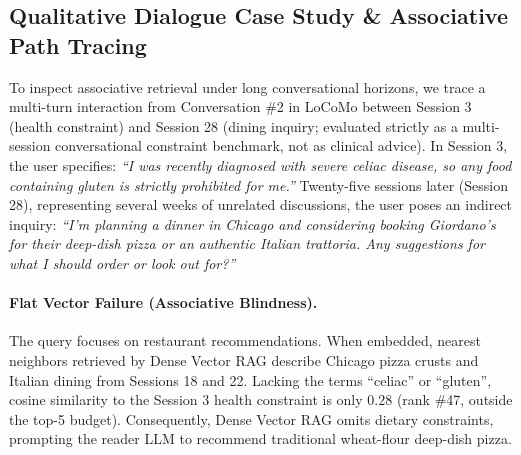 \documentclass[conference]{IEEEtran}
\begin{document}
\begin{table}[t]
\centering
{}
\caption{Downstream closed-loop LLM generative question answering performance on LoCoMo.}
\label{tab:closed_loop}
\end{table}
\enlargethispage{2\baselineskip}

\subsection{Qualitative Dialogue Case Study \& Associative Path Tracing}

To inspect associative retrieval under long conversational horizons, we trace a multi-turn interaction from Conversation \#2 in LoCoMo between Session 3 (health constraint) and Session 28 (dining inquiry; evaluated strictly as a multi-session conversational constraint benchmark, not as clinical advice). In Session 3, the user specifies: \textit{``I was recently diagnosed with severe celiac disease, so any food containing gluten is strictly prohibited for me.''} Twenty-five sessions later (Session 28), representing several weeks of unrelated discussions, the user poses an indirect inquiry: \textit{``I'm planning a dinner in Chicago and considering booking Giordano's for their deep-dish pizza or an authentic Italian trattoria. Any suggestions for what I should order or look out for?''}

\paragraph{Flat Vector Failure (Associative Blindness).}
The query focuses on restaurant recommendations. When embedded, nearest neighbors retrieved by Dense Vector RAG describe Chicago pizza crusts and Italian dining from Sessions 18 and 22. Lacking the terms ``celiac'' or ``gluten'', cosine similarity to the Session 3 health constraint is only $0.28$ (rank \#47, outside the top-5 budget). Consequently, Dense Vector RAG omits dietary constraints, prompting the reader LLM to recommend traditional wheat-flour deep-dish pizza.
\end{document}
